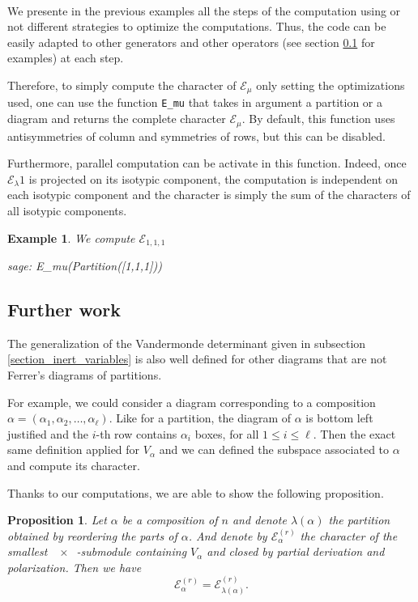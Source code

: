 \documentclass[letter,12pt]{article}
\newcommand{\pauline}[1]{\todo[linecolor=blue,backgroundcolor=cyan!25,bordercolor=blue]{#1}}
\newcommand{\Elambda}[1]{\mathcal{E}_{#1}}
\newcommand{\Elambdar}[2]{\mathcal{E}_{#1}^{(#2)}}
\DeclareMathOperator{\Sn}{\mathbb{S}_n}
\DeclareMathOperator{\GLr}{GL_r}
\newtheorem{prop}{Proposition}
\newtheorem{example}{Example}
\begin{document}
	~

	We presente in the previous examples all the steps of the computation using or not different strategies to optimize the computations. Thus, the code can be easily adapted to other generators and other operators (see section \ref{section_futher_work} for examples) at each step. 
	
	Therefore, to simply compute the character of $\Elambda{\mu}$ only setting the optimizations used, one can use the function \texttt{E\_mu} that takes in argument a partition or a diagram and returns the complete character $\Elambda{\mu}$. By default, this function uses antisymmetries of column and symmetries of rows, but this can be disabled.
	
	Furthermore, parallel computation can be activate in this function. Indeed, once $\Elambda{\lambda}{1}$ is projected on its isotypic component, the computation is independent on each isotypic component and the character is simply the sum of the characters of all isotypic components. 
	
	\begin{example} \pauline{Ajouter d'autres exemples pertinents.}
		We compute $\Elambda{1,1,1}$
		
		\begin{sagecommandline}
			sage: E_mu(Partition([1,1,1]))
		\end{sagecommandline}	
	\end{example}
	
	\subsection{Further work}\label{section_futher_work}
	
	The generalization of the Vandermonde determinant given in subsection \ref{section_inert_variables} is also well defined for other diagrams that are not Ferrer's diagrams of partitions. 
	
	For example, we could consider a diagram corresponding to a composition $\alpha = (\alpha_1, \alpha_2, \dots, \alpha_\ell)$. Like for a partition, the diagram of $\alpha$ is bottom left justified and the $i$-th row contains $\alpha_i$ boxes, for all $1 \leq i \leq \ell$. Then the exact same definition applied for $V_\alpha$ and we can defined the subspace associated to $\alpha$ and compute its character. 
	
	Thanks to our computations, we are able to show the following proposition. 
	
	\begin{prop}
		Let $\alpha$ be a composition of $n$ and denote $\lambda(\alpha)$ the partition obtained by reordering the parts of $\alpha$. And denote by $\Elambdar{\alpha}{r}$ the character of the smallest $\GLr \times \Sn$-submodule containing $V_\alpha$ and closed by partial derivation and polarization. Then we have 
		$$\Elambdar{\alpha}{r} = \Elambdar{\lambda(\alpha)}{r}.$$
	\end{prop} 
	
\end{document}
